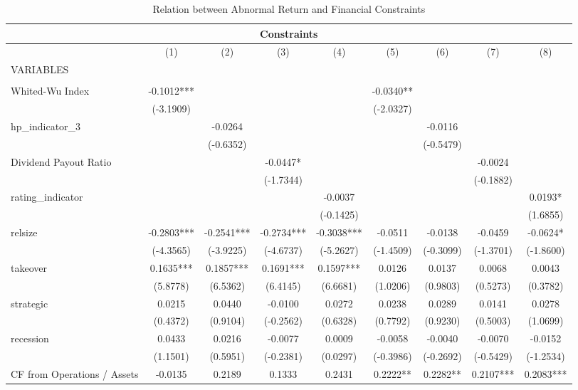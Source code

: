 \documentclass[12pt]{article}
\begin{document}
\begin{table}
	\centering
	\captionsetup{textformat=empty,labelformat=blank}
	\caption{Relation between Abnormal Return and Financial Constraints}
	\begin{adjustbox}{max width=\textwidth}
		\begin{tabular}{lcccccccc}
			\multicolumn{9}{c}{Constraints} \\ \hline
			 & (1) & (2) & (3) & (4) & (5) & (6) & (7) & (8) \\
			VARIABLES &  \\ \hline
			 &  &  &  &  &  &  &  &  \\
			Whited-Wu Index & -0.1012*** &  &  &  & -0.0340** &  &  &  \\
			 & (-3.1909) &  &  &  & (-2.0327) &  &  &  \\
			hp\_indicator\_3 &  & -0.0264 &  &  &  & -0.0116 &  &  \\
			 &  & (-0.6352) &  &  &  & (-0.5479) &  &  \\
			Dividend Payout Ratio &  &  & -0.0447* &  &  &  & -0.0024 &  \\
			 &  &  & (-1.7344) &  &  &  & (-0.1882) &  \\
			rating\_indicator &  &  &  & -0.0037 &  &  &  & 0.0193* \\
			 &  &  &  & (-0.1425) &  &  &  & (1.6855) \\
			relsize & -0.2803*** & -0.2541*** & -0.2734*** & -0.3038*** & -0.0511 & -0.0138 & -0.0459 & -0.0624* \\
			 & (-4.3565) & (-3.9225) & (-4.6737) & (-5.2627) & (-1.4509) & (-0.3099) & (-1.3701) & (-1.8600) \\
			takeover & 0.1635*** & 0.1857*** & 0.1691*** & 0.1597*** & 0.0126 & 0.0137 & 0.0068 & 0.0043 \\
			 & (5.8778) & (6.5362) & (6.4145) & (6.6681) & (1.0206) & (0.9803) & (0.5273) & (0.3782) \\
			strategic & 0.0215 & 0.0440 & -0.0100 & 0.0272 & 0.0238 & 0.0289 & 0.0141 & 0.0278 \\
			 & (0.4372) & (0.9104) & (-0.2562) & (0.6328) & (0.7792) & (0.9230) & (0.5003) & (1.0699) \\
			recession & 0.0433 & 0.0216 & -0.0077 & 0.0009 & -0.0058 & -0.0040 & -0.0070 & -0.0152 \\
			 & (1.1501) & (0.5951) & (-0.2381) & (0.0297) & (-0.3986) & (-0.2692) & (-0.5429) & (-1.2534) \\
			CF from Operations / Assets & -0.0135 & 0.2189 & 0.1333 & 0.2431 & 0.2222** & 0.2282** & 0.2107*** & 0.2083*** \\

\end{tabular}
\end{adjustbox}
\end{table}
\end{document}

